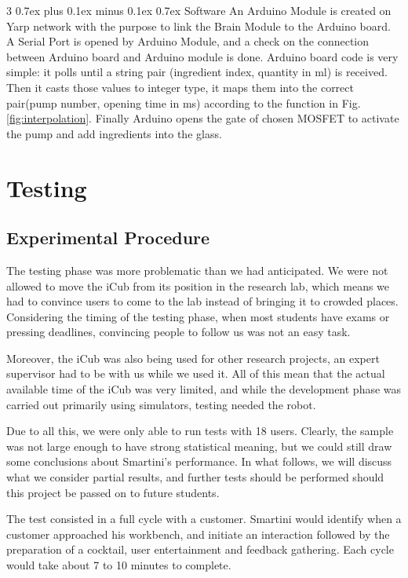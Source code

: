 \documentclass[conference]{IEEEtran}
\makeatletter
\def\subsubsection{\@startsection{subsubsection}%
	{3}%
	{\z@}%
	{0.7ex plus 0.1ex minus 0.1ex}%
	{0.7ex}%
	{\normalfont\normalsize\itshape}}%
\makeatother
\begin{document}
\subsubsection{Software}
An Arduino Module is created on Yarp network with the purpose to link the Brain Module to the Arduino board. A Serial Port is opened by Arduino Module, and a check on the connection between Arduino board and Arduino module is done. Arduino board code is very simple: it polls until a string pair (ingredient index, quantity in ml) is received. Then it casts those values to integer type, it maps them into the correct pair(pump number, opening time in ms) according to the function in Fig. \ref{fig:interpolation}. Finally Arduino opens the gate of chosen MOSFET to activate the pump and add ingredients into the glass.
\section{Testing}

\subsection{Experimental Procedure}

The testing phase was more problematic than we had anticipated. We were not allowed to move the iCub from its position in the research lab, which means we had to convince users to come to the lab instead of bringing it to crowded places. Considering the timing of the testing phase, when most students have exams or pressing deadlines, convincing people to follow us was not an easy task. 

Moreover, the iCub was also being used for other research projects, an expert supervisor had to be with us while we used it. All of this mean that the actual available time of the iCub was very limited, and while the development phase was carried out primarily using simulators, testing needed the robot. 

Due to all this, we were only able to run tests with 18 users. Clearly, the sample was not large enough to have strong statistical meaning, but we could still draw some conclusions about Smartini's performance. In what follows, we will discuss what we consider partial results, and further tests should be performed should this project be passed on to future students. 

The test consisted in a full cycle with a customer. Smartini would identify when a customer approached his workbench, and initiate an interaction followed by the preparation of a cocktail, user entertainment and feedback gathering. Each cycle would take about 7 to 10 minutes to complete. 
\end{document}
